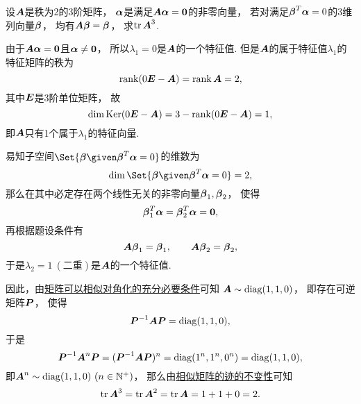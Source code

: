 \begin{example}
设\(\boldsymbol{A}\)是秩为2的3阶矩阵，
\(\boldsymbol\alpha\)是满足\(\boldsymbol{A} \boldsymbol\alpha = \boldsymbol0\)的非零向量，
若对满足\(\boldsymbol\beta^T \boldsymbol\alpha = 0\)的3维列向量\(\boldsymbol\beta\)，
均有\(\boldsymbol{A} \boldsymbol\beta = \boldsymbol\beta\)，
求\(\tr\boldsymbol{A}^3\).
\begin{solution}
由于\(\boldsymbol{A} \boldsymbol\alpha = \boldsymbol0\)且\(\boldsymbol\alpha \neq \boldsymbol0\)，
所以\(\lambda_1 = 0\)是\(\boldsymbol{A}\)的一个特征值.
但是\(\boldsymbol{A}\)的属于特征值\(\lambda_1\)的特征矩阵的秩为\begin{equation*}
	\rank(0\boldsymbol{E}-\boldsymbol{A})
	= \rank\boldsymbol{A}
	= 2,
\end{equation*}
其中\(\boldsymbol{E}\)是3阶单位矩阵，
故\begin{equation*}
	\dim\operatorname{Ker}(0\boldsymbol{E}-\boldsymbol{A})
	= 3 - \rank(0\boldsymbol{E}-\boldsymbol{A})
	= 1,
\end{equation*}
即\(\boldsymbol{A}\)只有1个属于\(\lambda_1\)的特征向量.

易知子空间\(\Set{\vb\beta \given \vb\beta^T \vb\alpha = 0}\)的维数为\begin{equation*}
	\dim\Set{\vb\beta \given \vb\beta^T \vb\alpha = 0} = 2,
\end{equation*}
那么在其中必定存在两个线性无关的非零向量\(\boldsymbol\beta_1,\boldsymbol\beta_2\)，
使得\begin{equation*}
	\boldsymbol\beta_1^T \boldsymbol\alpha
	= \boldsymbol\beta_2^T \boldsymbol\alpha
	= \boldsymbol0,
\end{equation*}
再根据题设条件有\begin{equation*}
	\boldsymbol{A}\boldsymbol\beta_1 = \boldsymbol\beta_1,
	\qquad
	\boldsymbol{A}\boldsymbol\beta_2 = \boldsymbol\beta_2,
\end{equation*}
于是\(\lambda_2 = 1\ (\text{二重})\)是\(\boldsymbol{A}\)的一个特征值.

因此，由\hyperref[theorem:矩阵相似对角化.矩阵可以相似对角化的充分必要条件]{矩阵可以相似对角化的充分必要条件}可知
\(\boldsymbol{A} \sim \operatorname{diag}(1,1,0)\)，
即存在可逆矩阵\(\boldsymbol{P}\)，
使得\begin{equation*}
	\boldsymbol{P}^{-1} \boldsymbol{A} \boldsymbol{P}
	= \operatorname{diag}(1,1,0),
\end{equation*}
于是\begin{equation*}
	\boldsymbol{P}^{-1} \boldsymbol{A}^n \boldsymbol{P}
	= (\boldsymbol{P}^{-1} \boldsymbol{A} \boldsymbol{P})^n
	= \operatorname{diag}(1^n,1^n,0^n)
	= \operatorname{diag}(1,1,0),
\end{equation*}
即\(\boldsymbol{A}^n \sim \operatorname{diag}(1,1,0)\ (n\in\mathbb{N}^+)\)，
那么由\hyperref[theorem:特征值与特征向量.相似矩阵的迹的不变性]{相似矩阵的迹的不变性}可知\begin{equation*}
	\tr\boldsymbol{A}^3
	= \tr\boldsymbol{A}^2
	= \tr\boldsymbol{A}
	= 1+1+0
	= 2.
\end{equation*}
\end{solution}
\end{example}

